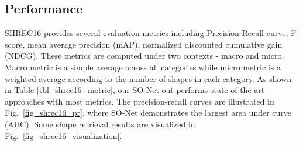 \documentclass[10pt,twocolumn,letterpaper]{article}
\begin{document}
\subsection{Performance}
SHREC16 provides several evaluation metrics including Precision-Recall curve, F-score, mean average precision (mAP), normalized discounted cumulative gain (NDCG). These metrics are computed under two contexts - macro and micro. Macro metric is a simple average across all categories while micro metric is a weighted average according to the number of shapes in each category. As shown in Table \ref{tbl_shrec16_metric}, our SO-Net out-performs state-of-the-art approaches with most metrics. The precision-recall curves are illustrated in Fig.~\ref{fig_shrec16_pr}, where SO-Net demonstrates the largest area under curve (AUC).
Some shape retrieval results are visualized in Fig.~\ref{fig_shrec16_visualization}.
\end{document}
